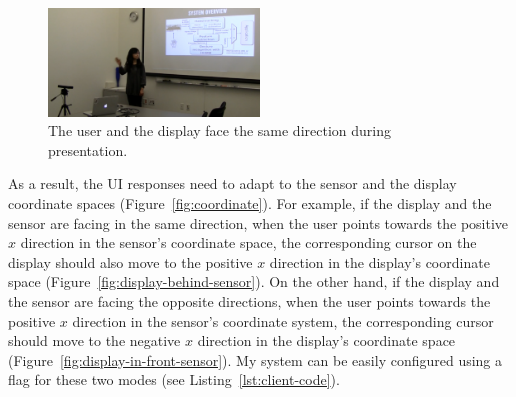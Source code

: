 \begin{figure}[tbh]
\centering
\includegraphics[width=0.5\textwidth]{figures/circle1.png}
\caption{The user and the display face the same direction during presentation.}
\label{fig:presentation}
\end{figure}

As a result, the UI responses
need to adapt to the sensor and the display coordinate spaces
(Figure~\ref{fig:coordinate}).
For example, if the display and the sensor are facing in the same direction,
when the user points towards the positive $x$ direction in the sensor's coordinate space, the corresponding cursor on the display should also
move to the positive $x$ direction in the display's coordinate space 
(Figure~\ref{fig:display-behind-sensor}).
On the other hand, if the display and the sensor are facing the opposite
directions, when the user points towards the positive $x$ direction in the
sensor's coordinate system, the corresponding cursor should move to the negative
$x$ direction in the display's coordinate space
(Figure~\ref{fig:display-in-front-sensor}). My system can be easily configured
using a flag for these two modes (see
Listing~\ref{lst:client-code}).

